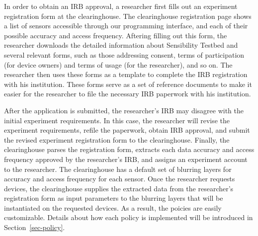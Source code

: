 In order to obtain an IRB approval, a researcher first fills out an experiment
registration form  at the 
clearinghouse. The clearinghouse registration page shows 
a list of sensors accessible through our programming interface, and 
each of their possible accuracy 
and access frequency. Aftering filling out this form, the researcher 
downloads the detailed information about Sensibility Testbed and 
several relevant forms, such as 
those addressing consent, terms of participation (for device owners) 
and terms of usage (for the researcher), and so on. The researcher then uses 
these forms as a template to complete the IRB registration with his institution.
These forms serve as a set of reference documents 
 to make it easier for the researcher to 
file the necessary IRB paperwork with his institution.

After the application is submitted, the researcher's IRB may disagree with 
the initial experiment requirements. %
In this case, the researcher will revise the experiment requirements, refile the paperwork, obtain IRB approval, and
submit the revised experiment registration form to the clearinghouse. Finally, the clearinghouse
parses the registration form, extracts each data accuracy and access 
frequency approved by the researcher's IRB, and assigns an experiment 
account to the researcher. The clearinghouse
has a default set of blurring layers for accuracy and access frequency for each sensor. Once the researcher requests 
devices, the clearinghouse supplies the extracted data from the 
researcher's registration form as input parameters to
the blurring layers that will be instantiated on the requested devices. 
As a result, the poicies are easily customizable. Details about
how each policy is implemented will be introduced in Section~\ref{sec-policy}.

